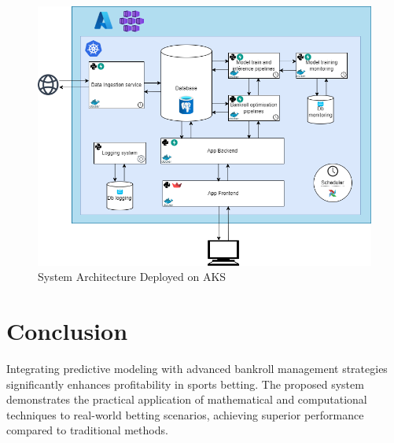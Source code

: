 \documentclass[6pt,twocolumn]{article}
\begin{document}
\begin{figure}[!htbp]
    \centering
    \includegraphics[width=0.9\linewidth]{statics/diagrem_archi_services.png}
    \caption{System Architecture Deployed on AKS}
    \label{fig:system_architecture}
\end{figure}

\section{Conclusion}
Integrating predictive modeling with advanced bankroll management strategies significantly enhances profitability in sports betting. The proposed system demonstrates the practical application of mathematical and computational techniques to real-world betting scenarios, achieving superior performance compared to traditional methods.
\end{document}
